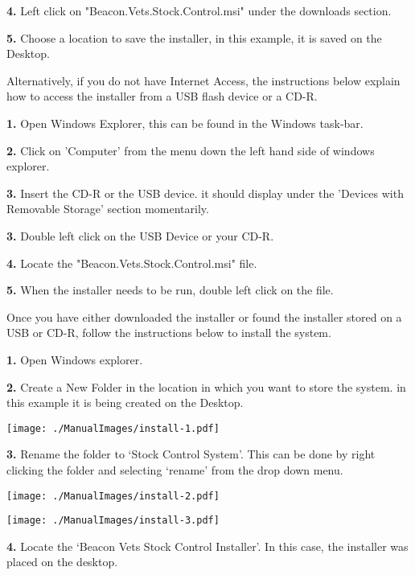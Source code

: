 \textbf{4.} Left click on "Beacon.Vets.Stock.Control.msi" under the downloads section. 

\textbf{5.} Choose a location to save the installer, in this example, it is saved on the Desktop.

\vspace{5mm}

Alternatively, if you do not have Internet Access, the instructions below explain how to access the installer from a USB flash device or a CD-R.

\textbf{1.} Open Windows Explorer, this can be found in the Windows task-bar.

\textbf{2.} Click on 'Computer' from the menu down the left hand side of windows explorer. 

\textbf{3.} Insert the CD-R or the USB device. it should display under the 'Devices with Removable Storage' section momentarily. 

\textbf{3.} Double left click on the USB Device or your CD-R.

\textbf{4.} Locate the "Beacon.Vets.Stock.Control.msi" file.

\textbf{5.} When the installer needs to be run, double left click on the file.


\vspace{5mm}

Once you have either downloaded the installer or found the installer stored on a USB or CD-R, follow the instructions below to install the system.

\textbf{1.} Open Windows explorer.

\textbf{2.} Create a New Folder in the location in which you want to store the system. in this example it is being created on the Desktop.

\texttt{[image: ./ManualImages/install-1.pdf]}

\pagebreak

\textbf{3.} Rename the folder to `Stock Control System'. This can be done by right clicking the folder and selecting `rename' from the drop down menu.

\texttt{[image: ./ManualImages/install-2.pdf]}

\texttt{[image: ./ManualImages/install-3.pdf]}

\pagebreak

\textbf{4.} Locate the `Beacon Vets Stock Control Installer'. In this case, the installer was placed on the desktop.


